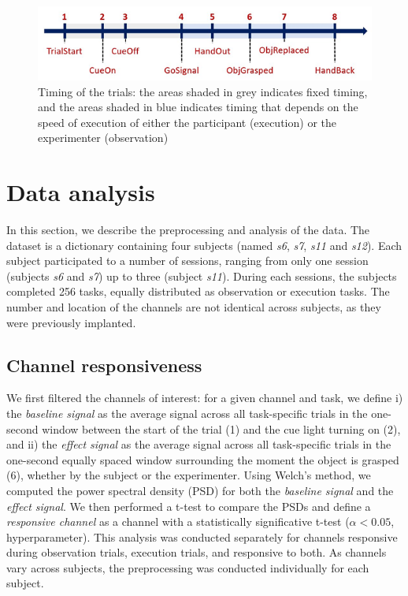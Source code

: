 \documentclass[10pt,conference,compsocconf]{IEEEtran}
\begin{document}
\begin{figure}[h!]
  \center
  \includegraphics[width=\linewidth]{images/2024-12-11-13-41-48.png}
  \caption{Timing of the trials: the areas shaded in grey indicates fixed timing, and the areas shaded in blue indicates timing that depends on the speed of execution of either the participant (execution) or the experimenter (observation)}
\end{figure}
\FloatBarrier

\section{Data analysis}
\label{sec:analysis}
In this section, we describe the preprocessing and analysis of the data. The dataset is a dictionary containing four subjects (named \textit{s6}, \textit{s7}, \textit{s11} and \textit{s12}). Each subject participated to a number of sessions, ranging from only one session (subjects \textit{s6} and \textit{s7}) up to three (subject \textit{s11}). During each sessions, the subjects completed 256 tasks, equally distributed as observation or execution tasks. The number and location of the channels are not identical across subjects, as they were previously implanted.

\subsection{Channel responsiveness}
We first filtered the channels of interest: for a given channel and task, we define i) the \textit{baseline signal} as the average signal across all task-specific trials in the one-second window between the start of the trial (1) and the cue light turning on (2), and ii) the \textit{effect signal} as the average signal across all task-specific trials in the one-second equally spaced window surrounding the moment the object is grasped (6), whether by the subject or the experimenter. Using Welch's method\cite{welch}, we computed the power spectral density (PSD) for both the \textit{baseline signal} and the \textit{effect signal}. We then performed a t-test to compare the PSDs and define a \textit{responsive channel} as a channel with a statistically significative t-test (\(\alpha<0.05\), hyperparameter). This analysis was conducted separately for channels responsive during observation trials, execution trials, and responsive to both. As channels vary across subjects, the preprocessing was conducted individually for each subject.
\end{document}
